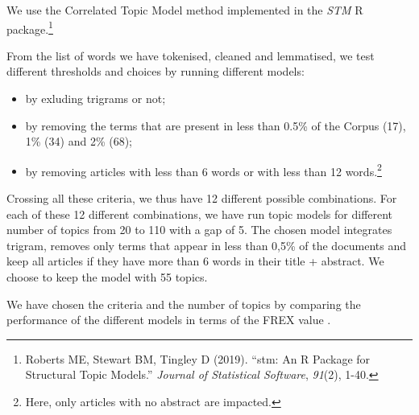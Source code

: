 \documentclass[]{elsarticle} %
\providecommand{\tightlist}{%
  \setlength{\itemsep}{0pt}\setlength{\parskip}{0pt}}
\begin{document}
We use the Correlated Topic Model \citep{blei2007} method implemented in
the \emph{STM} R package.\footnote{Roberts ME, Stewart BM, Tingley D
  (2019). ``stm: An R Package for Structural Topic Models.''
  \emph{Journal of Statistical Software}, \emph{91}(2), 1-40.}

From the list of words we have tokenised, cleaned and lemmatised, we
test different thresholds and choices by running different models:

\begin{itemize}
\tightlist
\item
  by exluding trigrams or not;
\item
  by removing the terms that are present in less than 0.5\% of the
  Corpus (17), 1\% (34) and 2\% (68);
\item
  by removing articles with less than 6 words or with less than 12
  words.\footnote{Here, only articles with no abstract are impacted.}
\end{itemize}

Crossing all these criteria, we thus have 12 different possible
combinations. For each of these 12 different combinations, we have run
topic models for different number of topics from 20 to 110 with a gap of
5. The chosen model integrates trigram, removes only terms that appear
in less than 0,5\% of the documents and keep all articles if they have
more than 6 words in their title + abstract. We choose to keep the model
with 55 topics.

We have chosen the criteria and the number of topics by comparing the
performance of the different models in terms of the FREX value
\citep{bischof2012}.


\end{document}
